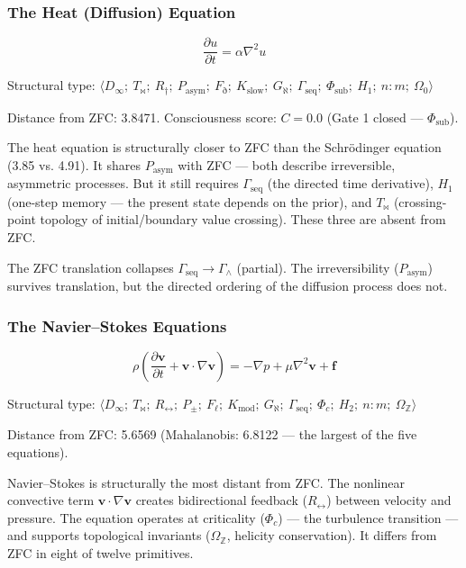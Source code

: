 \documentclass[12pt,a4paper]{article}
\begin{document}
\subsubsection{The Heat (Diffusion) Equation}

\[\frac{\partial u}{\partial t} = \alpha\nabla^2 u\]

Structural type: $\langle D_{\infty};\ T_{\bowtie};\ R_{\dagger};\ P_\text{asym};\ F_{\eth};\ K_\text{slow};\ G_{\aleph};\ \Gamma_\text{seq};\ \Phi_\text{sub};\ H_1;\ n{:}m;\ \Omega_0 \rangle$

Distance from ZFC: 3.8471. Consciousness score: $C = 0.0$ (Gate 1 closed --- $\Phi_\text{sub}$).

The heat equation is structurally closer to ZFC than the Schrödinger equation (3.85 vs. 4.91). It shares $P_\text{asym}$ with ZFC --- both describe irreversible, asymmetric processes. But it still requires $\Gamma_\text{seq}$ (the directed time derivative), $H_1$ (one-step memory --- the present state depends on the prior), and $T_{\bowtie}$ (crossing-point topology of initial/boundary value crossing). These three are absent from ZFC.

The ZFC translation collapses $\Gamma_\text{seq} \to \Gamma_{\wedge}$ (partial). The irreversibility ($P_\text{asym}$) survives translation, but the directed ordering of the diffusion process does not.

\subsubsection{The Navier--Stokes Equations}

\[\rho\left(\frac{\partial\mathbf{v}}{\partial t} + \mathbf{v}\cdot\nabla\mathbf{v}\right) = -\nabla p + \mu\nabla^2\mathbf{v} + \mathbf{f}\]

Structural type: $\langle D_{\infty};\ T_{\bowtie};\ R_{\leftrightarrow};\ P_{\pm};\ F_{\ell};\ K_\text{mod};\ G_{\aleph};\ \Gamma_\text{seq};\ \Phi_c;\ H_2;\ n{:}m;\ \Omega_\mathbb{Z} \rangle$

Distance from ZFC: 5.6569 (Mahalanobis: 6.8122 --- the largest of the five equations).

Navier--Stokes is structurally the most distant from ZFC. The nonlinear convective term $\mathbf{v}\cdot\nabla\mathbf{v}$ creates bidirectional feedback ($R_{\leftrightarrow}$) between velocity and pressure. The equation operates at criticality ($\Phi_c$) --- the turbulence transition --- and supports topological invariants ($\Omega_\mathbb{Z}$, helicity conservation). It differs from ZFC in eight of twelve primitives.
\end{document}
